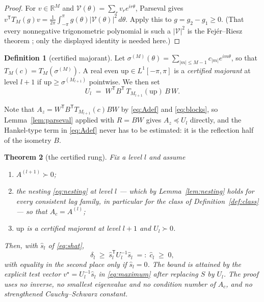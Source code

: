 \documentclass[11pt,a4paper]{article}
\theoremstyle{plain}
\newtheorem{theorem}{Theorem}[section]
\theoremstyle{definition}
\newtheorem{definition}[theorem]{Definition}
\newcommand{\R}{\mathbb{R}}
\newcommand{\T}{\mathsf{T}}
\newcommand{\Tm}[1]{T_{#1}}
\newcommand{\shat}{\widehat{s}}
\newcommand{\PD}{\succ 0}
\begin{document}
\begin{proof}
For $v\in\R^{M}$ and $\mathcal V(\theta)=\sum_{r}v_{r}e^{ir\theta}$, Parseval gives
$v^{\T}\Tm{M}(g)v=\frac1{2\pi}\int_{-\pi}^{\pi}g(\theta)|\mathcal V(\theta)|^{2}\,d\theta$.
Apply this to $g=g_{2}-g_{1}\ge0$. (That every nonnegative trigonometric polynomial
is such a $|\mathcal V|^{2}$ is the Fej\'er--Riesz theorem
\cite{Fejer1916,Riesz1916}; only the displayed identity is needed here.)
\end{proof}

\begin{definition}[certified majorant]
\label{def:majorant}
Let $\sigma^{(M)}(\theta)=\sum_{|m|\le M-1}c_{|m|}e^{im\theta}$, so that
$\Tm{M}(c)=\Tm{M}(\sigma^{(M)})$. A real even
$\mathrm{up}\in L^{1}[-\pi,\pi]$ is a \emph{certified majorant} at level $l+1$ if
$\mathrm{up}\ge\sigma^{(M_{l+1})}$ pointwise. We then set
\begin{equation}
\label{eq:U}
  U_{l} \;=\; W^{\T}B^{\T}\,\Tm{M_{l+1}}(\mathrm{up})\,B\,W .
\end{equation}
\end{definition}

Note that $A_{z}=W^{\T}B^{\T}\Tm{M_{l+1}}(c)BW$ by \eqref{eq:Adef} and
\eqref{eq:blocks}, so Lemma~\ref{lem:parseval} applied with $R=BW$ gives
$A_{z}\preceq U_{l}$ directly, and the Hankel-type term in \eqref{eq:Adef} never has
to be estimated: it is the reflection half of the isometry $B$.

\begin{theorem}[the certified rung]
\label{thm:rung}
Fix a level $l$ and assume
\begin{enumerate}[label=\textup{(H\arabic*)},leftmargin=3.2em]
\item\label{H:pd} $A^{(l+1)}\PD$;
\item\label{H:nest} the nesting \eqref{eq:nesting} at level $l$ --- which by
      Lemma~\ref{lem:nesting} holds for every consistent lag family, in particular for
      the class of Definition~\ref{def:class} --- so that $A_{c}=A^{(l)}$;
\item\label{H:maj} $\mathrm{up}$ is a certified majorant at level $l+1$ and
      $U_{l}\PD$.
\end{enumerate}
Then, with $\shat_{l}$ of \eqref{eq:shat},
\begin{equation}
\label{eq:8R}
  \delta_{l} \;\ge\; \shat_{l}^{\T}U_{l}^{-1}\shat_{l} \;=:\; \widehat c_{l}
  \;\ge\;0 ,
\end{equation}
with equality in the second place only if $\shat_{l}=0$. The bound is attained by the
explicit test vector $v^{\star}=U_{l}^{-1}\shat_{l}$ in \eqref{eq:maximum} after
replacing $S$ by $U_{l}$. The proof uses no inverse, no smallest eigenvalue and no
condition number of $A_{c}$, and no strengthened Cauchy--Schwarz constant.
\end{theorem}
\end{document}
